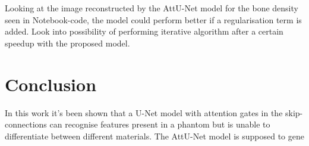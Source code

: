 \documentclass{article}
\begin{document}
Looking at the image reconstructed by the AttU-Net model for the bone density seen in Notebook-code, the model could perform better if a regularisation term is added. Look into possibility of performing iterative algorithm after a certain speedup with the proposed model.

\section{Conclusion}

In this work it's been shown that a U-Net model with attention gates in the skip-connections can recognise features present in a phantom but is unable to differentiate between different materials. The AttU-Net model is supposed to gene

\clearpage

\end{document}
